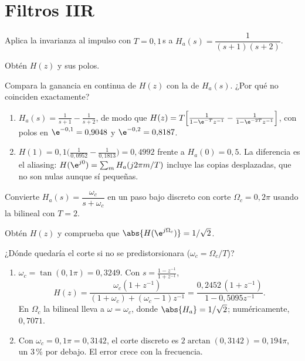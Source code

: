 \documentclass[11pt,a4paper]{scrartcl}
\begin{document}
\section*{Filtros IIR}

\begin{ejercicio}
  Aplica la invarianza al impulso con $T=0{,}1$\,s a $H_a(s)=\dfrac{1}{(s+1)(s+2)}$.
  \begin{incisos}[1]
    \item Obtén $H(z)$ y sus polos.
    \item Compara la ganancia en continua de $H(z)$ con la de $H_a(s)$. ¿Por qué no coinciden exactamente?
  \end{incisos}
\end{ejercicio}
\begin{solucion}
  \begin{enumerate}[label=\alph*)]
    \item $H_a(s)=\frac{1}{s+1}-\frac{1}{s+2}$, de modo que $H(z)=T\Big[\frac{1}{1-\e^{-T}z^{-1}}-\frac{1}{1-\e^{-2T}z^{-1}}\Big]$, con polos en $\e^{-0,1}=0{,}9048$ y $\e^{-0,2}=0{,}8187$.
    \item $H(1)=0{,}1\big(\frac{1}{0{,}0952}-\frac{1}{0{,}1813}\big)=0{,}4992$ frente a $H_a(0)=0{,}5$. La diferencia es el aliasing: $H(\e^{j0})=\sum_mH_a(j2\pi m/T)$ incluye las copias desplazadas, que no son nulas aunque sí pequeñas.
  \end{enumerate}
\end{solucion}

\begin{ejercicio}
  Convierte $H_a(s)=\dfrac{\omega_c}{s+\omega_c}$ en un paso bajo discreto con corte $\Omega_c=0{,}2\pi$ usando la bilineal con $T=2$.
  \begin{incisos}[1]
    \item Obtén $H(z)$ y comprueba que $\abs{H(\e^{j\Omega_c})}=1/\sqrt2$.
    \item ¿Dónde quedaría el corte si no se predistorsionara ($\omega_c=\Omega_c/T$)?
  \end{incisos}
\end{ejercicio}
\begin{solucion}
  \begin{enumerate}[label=\alph*)]
    \item $\omega_c=\tan(0{,}1\pi)=0{,}3249$. Con $s=\frac{1-z^{-1}}{1+z^{-1}}$,
    \[
      H(z)=\frac{\omega_c(1+z^{-1})}{(1+\omega_c)+(\omega_c-1)z^{-1}}=\frac{0{,}2452\,(1+z^{-1})}{1-0{,}5095z^{-1}}.
    \]
    En $\Omega_c$ la bilineal lleva a $\omega=\omega_c$, donde $\abs{H_a}=1/\sqrt2$; numéricamente, $0{,}7071$.
    \item Con $\omega_c=0{,}1\pi=0{,}3142$, el corte discreto es $2\arctan(0{,}3142)=0{,}194\pi$, un 3\,\% por debajo. El error crece con la frecuencia.
  \end{enumerate}
\end{solucion}
\end{document}
